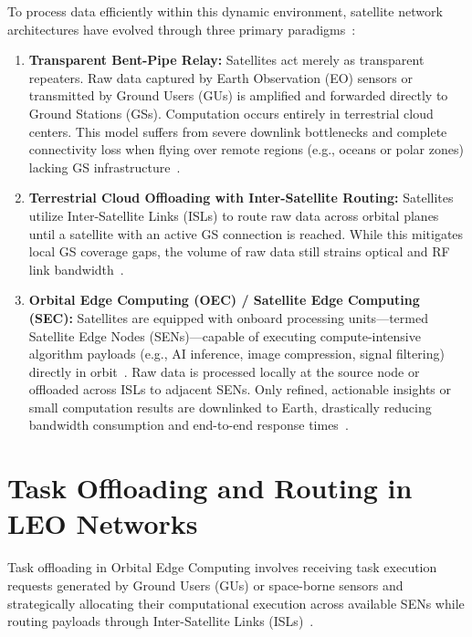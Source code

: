 To process data efficiently within this dynamic environment, satellite network architectures have evolved through three primary paradigms~\cite{denby2019orbital, survey_orbital_edge_2023}:

\begin{enumerate}
    \item \textbf{Transparent Bent-Pipe Relay:} Satellites act merely as transparent repeaters. Raw data captured by Earth Observation (EO) sensors or transmitted by Ground Users (GUs) is amplified and forwarded directly to Ground Stations (GSs). Computation occurs entirely in terrestrial cloud centers. This model suffers from severe downlink bottlenecks and complete connectivity loss when flying over remote regions (e.g., oceans or polar zones) lacking GS infrastructure~\cite{leyva2023satellite}.
    \item \textbf{Terrestrial Cloud Offloading with Inter-Satellite Routing:} Satellites utilize Inter-Satellite Links (ISLs) to route raw data across orbital planes until a satellite with an active GS connection is reached. While this mitigates local GS coverage gaps, the volume of raw data still strains optical and RF link bandwidth~\cite{chen2021isl, chaudhry2021laser}.
    \item \textbf{Orbital Edge Computing (OEC) / Satellite Edge Computing (SEC):} Satellites are equipped with onboard processing units—termed Satellite Edge Nodes (SENs)—capable of executing compute-intensive algorithm payloads (e.g., AI inference, image compression, signal filtering) directly in orbit~\cite{denby2020asplos, fan2025satellite}. Raw data is processed locally at the source node or offloaded across ISLs to adjacent SENs. Only refined, actionable insights or small computation results are downlinked to Earth, drastically reducing bandwidth consumption and end-to-end response times~\cite{tiansuan2023, jiang2025remote}.
\end{enumerate}

\section{Task Offloading and Routing in LEO Networks}
\label{sec:bg_offloading_routing}

Task offloading in Orbital Edge Computing involves receiving task execution requests generated by Ground Users (GUs) or space-borne sensors and strategically allocating their computational execution across available SENs while routing payloads through Inter-Satellite Links (ISLs)~\cite{zhong2025leo, icdcs_satellite_2025}.

